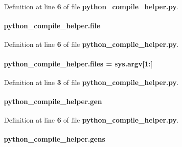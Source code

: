 Definition at line {\bf 6} of file {\bf python\+\_\+compile\+\_\+helper.\+py}.

\paragraph[{file}]{\setlength{\rightskip}{0pt plus 5cm}python\+\_\+compile\+\_\+helper.\+file}\label{namespacepython__compile__helper_af504b699fb7b25eb45b3c148736a516e}


Definition at line {\bf 6} of file {\bf python\+\_\+compile\+\_\+helper.\+py}.

\paragraph[{files}]{\setlength{\rightskip}{0pt plus 5cm}python\+\_\+compile\+\_\+helper.\+files = sys.\+argv[1\+:]}\label{namespacepython__compile__helper_a05fdd09c8ab9eb2b5398fe8f2fcb72a7}


Definition at line {\bf 3} of file {\bf python\+\_\+compile\+\_\+helper.\+py}.

\paragraph[{gen}]{\setlength{\rightskip}{0pt plus 5cm}python\+\_\+compile\+\_\+helper.\+gen}\label{namespacepython__compile__helper_a8b314cbeae23f869da40e68e875c76d0}


Definition at line {\bf 6} of file {\bf python\+\_\+compile\+\_\+helper.\+py}.

\paragraph[{gens}]{\setlength{\rightskip}{0pt plus 5cm}python\+\_\+compile\+\_\+helper.\+gens}\label{namespacepython__compile__helper_ae4df4b771d8f52c6cba0410c323d6e45}


